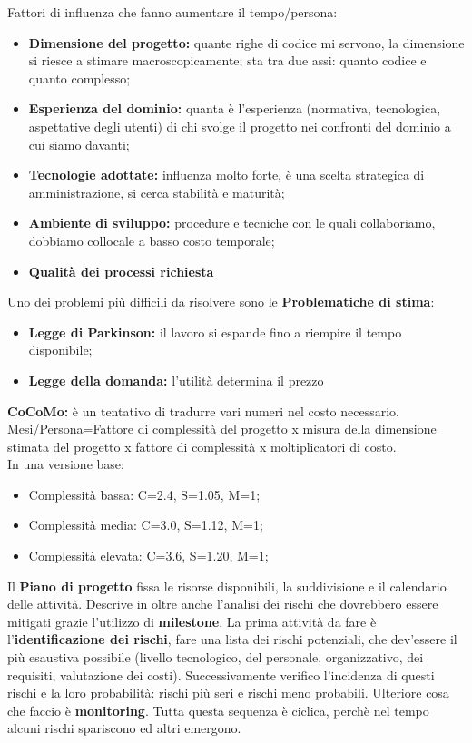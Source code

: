 Fattori di influenza che fanno aumentare il tempo/persona:
\begin{itemize}
	\item \textbf{Dimensione del progetto:} quante righe di codice mi servono, la dimensione si riesce a stimare macroscopicamente; sta tra due assi: quanto codice e quanto complesso;
	\item \textbf{Esperienza del dominio:} quanta è l'esperienza (normativa, tecnologica, aspettative degli utenti) di chi svolge il progetto nei confronti del dominio a cui siamo davanti;
	\item \textbf{Tecnologie adottate:} influenza molto forte, è una scelta strategica di amministrazione, si cerca stabilità e maturità;
	\item \textbf{Ambiente di sviluppo:} procedure e tecniche con le quali collaboriamo, dobbiamo collocale a basso costo temporale;
	\item \textbf{Qualità dei processi richiesta}
\end{itemize}

Uno dei problemi più difficili da risolvere sono le \textbf{Problematiche di stima}:
\begin{itemize}
	\item \textbf{Legge di Parkinson:} il lavoro si espande fino a riempire il tempo disponibile;
	\item \textbf{Legge della domanda:} l'utilità determina il prezzo
\end{itemize}

\textbf{CoCoMo:}  è un tentativo di tradurre vari numeri nel costo necessario. \\
Mesi/Persona=Fattore di complessità del progetto x misura della dimensione stimata del progetto x fattore di complessità x moltiplicatori di costo.
\\
In una versione base:
\begin{itemize}
	\item Complessità bassa: C=2.4, S=1.05, M=1;
	\item Complessità media: C=3.0, S=1.12, M=1;
	\item Complessità elevata: C=3.6, S=1.20, M=1;
\end{itemize}

Il \textbf{Piano di progetto} fissa le risorse disponibili, la suddivisione e il calendario delle attività. Descrive in oltre anche l'analisi dei rischi che dovrebbero essere mitigati grazie l'utilizzo di \textbf{milestone}.
La prima attività da fare è l'\textbf{identificazione dei rischi}, fare una lista dei rischi potenziali, che dev'essere il più esaustiva possibile (livello tecnologico, del personale, organizzativo, dei requisiti, valutazione dei costi). Successivamente verifico l'incidenza di questi rischi e la loro probabilità: rischi più seri e rischi meno probabili. Ulteriore cosa che faccio è \textbf{monitoring}. Tutta questa sequenza è ciclica, perchè nel tempo alcuni rischi spariscono ed altri emergono.



